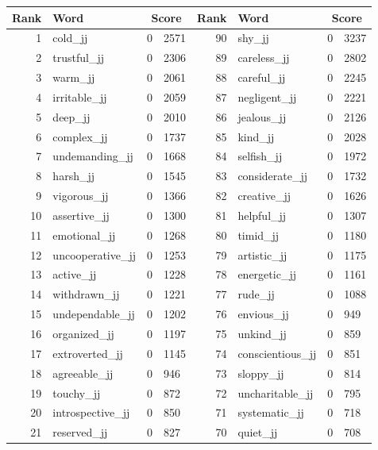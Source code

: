 \begin{table}[tbp]
    \begin{tabular}{| rlr@{.}l | rlr@{.}l |}
    \hline
    \textbf{Rank} & \textbf{Word} & \multicolumn{2}{c|}{\textbf{Score}} & \textbf{Rank} & \textbf{Word} & \multicolumn{2}{c|}{\textbf{Score}} \\
    \hline
    1 & cold\_jj & 0 & 2571    &    90 & shy\_jj & 0 & 3237 \\
    2 & trustful\_jj & 0 & 2306    &    89 & careless\_jj & 0 & 2802 \\
    3 & warm\_jj & 0 & 2061    &    88 & careful\_jj & 0 & 2245 \\
    4 & irritable\_jj & 0 & 2059    &    87 & negligent\_jj & 0 & 2221 \\
    5 & deep\_jj & 0 & 2010    &    86 & jealous\_jj & 0 & 2126 \\
    6 & complex\_jj & 0 & 1737    &    85 & kind\_jj & 0 & 2028 \\
    7 & undemanding\_jj & 0 & 1668    &    84 & selfish\_jj & 0 & 1972 \\
    8 & harsh\_jj & 0 & 1545    &    83 & considerate\_jj & 0 & 1732 \\
    9 & vigorous\_jj & 0 & 1366    &    82 & creative\_jj & 0 & 1626 \\
    10 & assertive\_jj & 0 & 1300    &    81 & helpful\_jj & 0 & 1307 \\
    11 & emotional\_jj & 0 & 1268    &    80 & timid\_jj & 0 & 1180 \\
    12 & uncooperative\_jj & 0 & 1253    &    79 & artistic\_jj & 0 & 1175 \\
    13 & active\_jj & 0 & 1228    &    78 & energetic\_jj & 0 & 1161 \\
    14 & withdrawn\_jj & 0 & 1221    &    77 & rude\_jj & 0 & 1088 \\
    15 & undependable\_jj & 0 & 1202    &    76 & envious\_jj & 0 & 949 \\
    16 & organized\_jj & 0 & 1197    &    75 & unkind\_jj & 0 & 859 \\
    17 & extroverted\_jj & 0 & 1145    &    74 & conscientious\_jj & 0 & 851 \\
    18 & agreeable\_jj & 0 & 946    &    73 & sloppy\_jj & 0 & 814 \\
    19 & touchy\_jj & 0 & 872    &    72 & uncharitable\_jj & 0 & 795 \\
    20 & introspective\_jj & 0 & 850    &    71 & systematic\_jj & 0 & 718 \\
    21 & reserved\_jj & 0 & 827    &    70 & quiet\_jj & 0 & 708 \\

\end{tabular}
\end{table}
